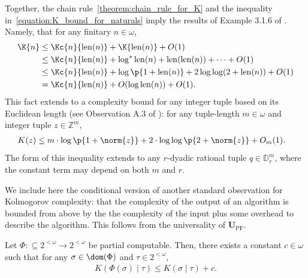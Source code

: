 Together, the chain rule~\ref{theorem:chain_rule_for_K} and the inequality in~\eqref{equation:K_bound_for_naturals} imply the results of Example 3.1.6 of \cite{LV08}. Namely, that for any finitary $n \in \omega$, 
\begin{align}
    \K{n} &\leq \Kc{n}{\operatorname{len}(n)} + \K{\operatorname{len}(n)} + O(1) \nonumber \\
    &\leq \Kc{n}{\operatorname{len}(n)} + \log^* \operatorname{len}(n) + \operatorname{len}(\operatorname{len}(n))+ \cdots + O(1) \label{upper_limit_to_K}\\
    &\leq \Kc{n}{\operatorname{len}(n)} + \log \p{1 + \operatorname{len}(n)} + 2 \log \log (2 + \operatorname{len}(n)) + O(1) \nonumber \\
    &= \Kc{n}{\operatorname{len}(n)} + O(\log \operatorname{len}(n)) + O(1). \nonumber
\end{align}
This fact extends to a complexity bound for any integer tuple based on its Euclidean length (see Observation A.3 of \cite{LL18}): for any tuple-length $m \in \omega$ and integer tuple $z \in \mathbb{Z}^m$,
\begin{align}
    \label{equation:K_bound_int_tuple}
    K(z) &\leq m \cdot \log \p{1 + \norm{z}} + 2 \cdot \log \log \p{2 + \norm{z}} + O_m(1).
\end{align}
The form of this inequality extends to any $r$-dyadic rational tuple $q \in \mathbb{D}^m_r$, where the constant term may depend on both $m$ and $r$. 

We include here the conditional version of another standard observation for Kolmogorov complexity: that the complexity of the output of an algorithm is bounded from above by the the complexity of the input plus some overhead to describe the algorithm. This follows from the universality of $\mathbf{U}_{\operatorname{PF}}$. 

\begin{theorem}
    \label{theorem:bounded_computable_output}
    Let $\Phi : \subseteq 2^{<\omega} \to 2^{<\omega}$ be partial computable. Then, there exists a constant $c \in \omega$ such that for any $\sigma \in \dom(\Phi)$ and $\tau \in 2^{<\omega}$,
    \begin{align*}
        K(\Phi(\sigma) \mid \tau) \leq K(\sigma \mid \tau) + c.
    \end{align*}
\end{theorem}

